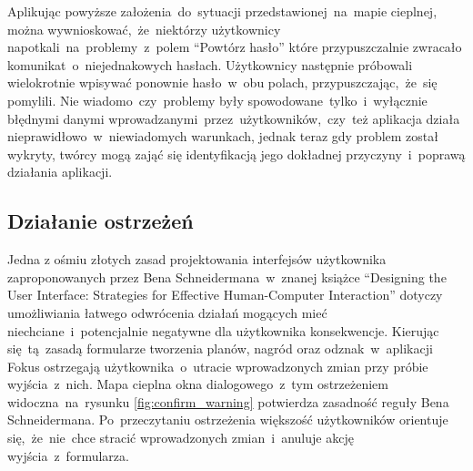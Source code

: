 Aplikując powyższe założenia~do~sytuacji przedstawionej~na~mapie cieplnej, można wywnioskować,~że~niektórzy użytkownicy napotkali~na~problemy~z~polem ``Powtórz hasło'' które przypuszczalnie zwracało komunikat~o~niejednakowych hasłach. Użytkownicy następnie próbowali wielokrotnie wpisywać ponownie hasło~w~obu polach, przypuszczając,~że~się pomylili. Nie wiadomo~czy~problemy były spowodowane~tylko~i~wyłącznie błędnymi danymi wprowadzanymi~przez~użytkowników,~czy~też aplikacja działa nieprawidłowo~w~niewiadomych warunkach, jednak teraz gdy problem został wykryty, twórcy mogą zająć się identyfikacją jego dokładnej przyczyny~i~poprawą działania aplikacji.

\bigskip
{}

\subsection{Działanie ostrzeżeń}
Jedna z ośmiu złotych zasad projektowania interfejsów użytkownika zaproponowanych przez Bena Schneidermana~w~znanej książce ``Designing the User Interface: Strategies for Effective Human-Computer Interaction'' \cite{Designing_IU} dotyczy umożliwiania łatwego odwrócenia działań mogących mieć niechciane~i~potencjalnie negatywne dla użytkownika konsekwencje. Kierując się~tą~zasadą formularze tworzenia planów, nagród oraz odznak~w~aplikacji Fokus ostrzegają użytkownika~o~utracie wprowadzonych zmian przy próbie wyjścia~z~nich. Mapa cieplna okna dialogowego~z~tym ostrzeżeniem widoczna~na~rysunku \ref{fig:confirm_warning} potwierdza zasadność reguły Bena Schneidermana. Po~przeczytaniu ostrzeżenia większość użytkowników orientuje się,~że~nie~chce stracić wprowadzonych zmian~i~anuluje akcję wyjścia~z~formularza.

\bigskip
{}
